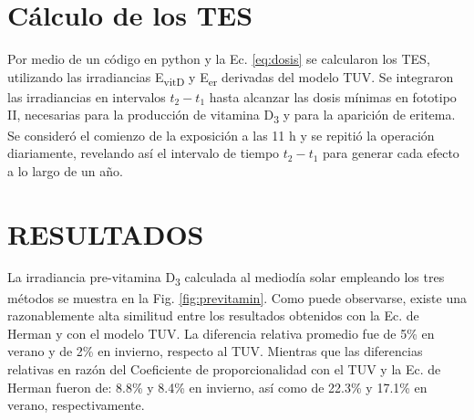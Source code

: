 \documentclass[10pt,twocolumn]{article}
\begin{document}
\section{Cálculo de los TES}
Por medio de un código en python y la Ec. \ref{eq:dosis} se calcularon los TES, utilizando las irradiancias E\textsubscript{vitD} y E\textsubscript{er} derivadas del modelo TUV. Se integraron las irradiancias en intervalos $t_2-t_1$ hasta alcanzar las dosis mínimas en fototipo II, necesarias para la producción de vitamina D\textsubscript{3} y para la aparición de eritema. Se consideró el comienzo de la exposición a las 11 h y se repitió la operación diariamente, revelando así el intervalo de tiempo $t_2-t_1$ para generar cada efecto a lo largo de un año.

\section{RESULTADOS}
La irradiancia pre-vitamina D\textsubscript{3} calculada al mediodía solar empleando los tres métodos se muestra en la Fig. \ref{fig:previtamin}. Como puede observarse, existe una razonablemente alta similitud entre los resultados obtenidos con la Ec. de Herman y con el modelo TUV. La diferencia relativa promedio fue de 5\% en verano y de 2\% en invierno, respecto al TUV. Mientras que las diferencias relativas en razón del Coeficiente de proporcionalidad con el TUV y la Ec. de Herman fueron de: 8.8\% y 8.4\% en invierno, así como de 22.3\% y 17.1\% en verano, respectivamente.
\end{document}
